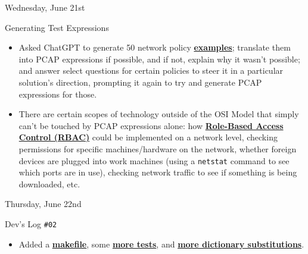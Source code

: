 \documentclass[11pt]{article}
\begin{document}
\normalsize\begin{yellowbox}{Wednesday, June 21st\vspace{-2.2em}\begin{flushright}\large Generating Test Expressions \end{flushright}}
    \begin{itemize}         
        \item Asked ChatGPT to generate 50 network policy \href{https://chat.openai.com/share/212960e8-fdef-4c9d-adf2-39c76e055d18}{\textbf{examples}}; translate them into PCAP expressions if possible, and if not, explain why it wasn't possible; and answer select questions for certain policies to steer it in a particular solution's direction, prompting it again to try and generate PCAP expressions for those. 
        \vspace{-0.25em}
        \item There are certain scopes of technology outside of the OSI Model that simply can't be touched by PCAP expressions alone: how \href{https://en.wikipedia.org/wiki/Role-based_access_control}{\textbf{Role-Based Access Control (RBAC)}} could be implemented on a network level, checking permissions for specific machines/hardware on the network, whether foreign devices are plugged into work machines (using a \texttt{netstat} command to see which ports are in use), checking network traffic to see if something is being downloaded, etc.
    \end{itemize}
\end{yellowbox}

\begin{center}
    \vspace{-0.25em}
    \hspace{0.2cm}
    \vspace{-0.4em}
\end{center}

\normalsize\begin{yellowbox}{Thursday, June 22nd\vspace{-2.2em}\begin{flushright}Dev's Log \texttt{\#02}\hspace{0.5cm}\end{flushright}}
    \begin{itemize}         
        \item Added a \href{https://github.com/usnistgov/ngpac/commit/92ea523849d1a1eb5a4262029406925110c99c0f}{\textbf{makefile}}, some \href{https://github.com/usnistgov/ngpac/commit/8385e4a9da07696af2ae6c05b478f9bd7df5191b}{\textbf{more tests}}, and \href{https://github.com/usnistgov/ngpac/commit/79d7e183344d458e93a6b4d3867796c3c60dbd15}{\textbf{more dictionary substitutions}}.
    \end{itemize}
\end{yellowbox}
\end{document}
